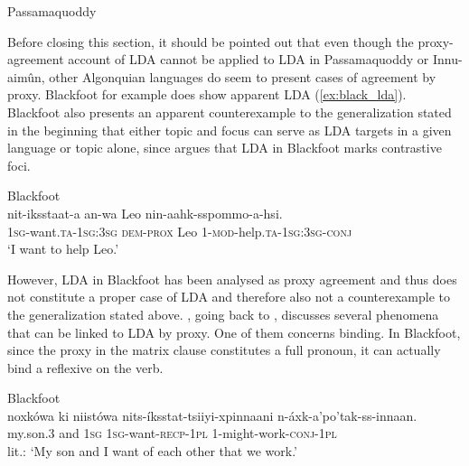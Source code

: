\documentclass[output=paper
,modfonts
,nonflat]{langsci/langscibook}
\begin{document}
\begin{exe}
\ex Passamaquoddy \citep[][270]{Bruening2001a} \label{ex:passam_pro}
	\xlist
	\endxlist
\end{exe}
Before closing this section, it should be pointed out that even though the proxy-agreement account of LDA cannot be applied to LDA in Passamaquoddy or Innu-aim\^{u}n, other Algonquian languages do seem to present cases of agreement by proxy. Blackfoot for example does show apparent LDA (\ref{ex:black_lda}). Blackfoot also pres\-ents an apparent counterexample to the generalization stated in the beginning that either topic and focus can serve as LDA targets in a given language or topic alone, since \citet{Bliss2009} argues that LDA in Blackfoot marks contrastive foci.
\begin{exe}
\ex Blackfoot \citep[][1]{Bliss2009}\label{ex:black_lda}\\
	\gll nit-iksstaat-a an-wa Leo nin-aahk-sspommo-a-hsi.\\
		 \textsc{1sg}-want.\textsc{ta}-\textsc{1sg:3sg} \textsc{dem-prox} Leo 1-\textsc{mod}-help.\textsc{ta-1sg:3sg-conj}\\
	\glt `I want to help Leo.'
\end{exe}
However, LDA in Blackfoot has been analysed as proxy agreement and thus does not constitute a proper case of LDA and therefore also not a counterexample to the generalization stated above. \citet{Polinsky2003}, going back to \citet{Frantz1978}, discusses several phenomena that can be linked to LDA by proxy. One of them concerns binding. In Blackfoot, since the proxy in the matrix clause constitutes a full pronoun, it can actually bind a reflexive on the verb.
\begin{exe}
\ex Blackfoot \citep[][99, via Polinsky 2003: 286]{Frantz1978}\\
	\gll noxk\'{o}wa ki niist\'{o}wa nits-\'{i}ksstat-tsiiyi-xpinnaani n-\'{a}xk-a'po'tak-ss-innaan.\\
		 my.son.3 and \textsc{1sg} \textsc{1sg}-want-\textsc{recp}-1\textsc{pl} 1-might-work-\textsc{conj-1pl}\\
	\glt lit.: `My son and I want of each other that we work.'
\end{exe}
\end{document}
